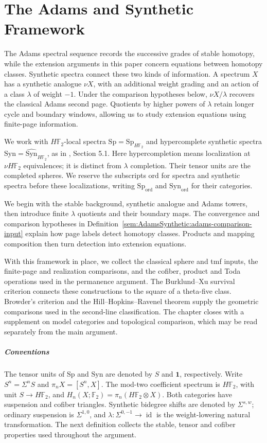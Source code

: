 \chapter{The Adams and Synthetic Framework}
The Adams spectral sequence records the successive grades of stable
homotopy, while the extension arguments in this paper concern equations
between homotopy classes. Synthetic spectra connect these two kinds of
information. A spectrum $X$ has a synthetic analogue $\nu X$, with an
additional weight grading and an action of a class $\lambda$ of weight
$-1$. Under the comparison hypotheses below, $\nu X/\lambda$
recovers the classical Adams second page. Quotients by higher powers of
$\lambda$ retain longer cycle and boundary windows, allowing us to study
extension equations using finite-page information.

We work with $H\mathbb F_2$-local spectra
$\mathrm{Sp}=\mathrm{Sp}_{H\mathbb F_2}$ and hypercomplete synthetic spectra
$\mathrm{Syn}=\widehat{\mathrm{Syn}}_{H\mathbb F_2}$, as in
\cite{Pst}, Section 5.1. Here hypercompletion means localization at
$\nu H\mathbb F_2$ equivalences; it is distinct from $\lambda$ completion.
Their tensor units are the completed spheres. We reserve the subscripts
$\mathrm{ord}$ for spectra and synthetic spectra before these
localizations, writing $\mathrm{Sp}_{\mathrm{ord}}$ and
$\mathrm{Syn}_{\mathrm{ord}}$ for their categories.

We begin with the stable background, synthetic analogue and Adams
towers, then introduce finite $\lambda$ quotients and their boundary maps.
The convergence and comparison hypotheses in
Definition~\ref{sem:AdamsSynthetic:adams-comparison-input} explain how
page labels detect homotopy classes. Products and mapping composition
then turn detection into extension equations.

With this framework in place, we collect the classical sphere and tmf
inputs, the finite-page and realization comparisons, and the cofiber,
product and Toda operations used in the permanence argument. The
Burklund--Xu survival criterion connects these constructions to the
square of a theta-five class. Browder's criterion and the
Hill--Hopkins--Ravenel theorem supply the geometric comparisons used
in the second-line classification. The chapter closes with a supplement
on model categories and topological comparison, which may be read
separately from the main argument.

\paragraph*{Conventions}
The tensor units of $\mathrm{Sp}$ and $\mathrm{Syn}$ are denoted by $S$
and $\mathbf1$, respectively. Write $S^n=\Sigma^nS$ and
$\pi_nX=[S^n,X]$. The mod-two coefficient spectrum is $H\mathbb F_2$,
with unit $S\to H\mathbb F_2$, and
$H_n(X;\mathbb F_2)=\pi_n(H\mathbb F_2\otimes X)$.
Both categories have suspension and cofiber triangles. Synthetic
bidegree shifts are denoted by $\Sigma^{s,w}$; ordinary suspension is
$\Sigma^{1,0}$, and $\lambda:\Sigma^{0,-1}\to\operatorname{id}$ is the
weight-lowering natural transformation. The next definition collects the
stable, tensor and cofiber properties used throughout the argument.

